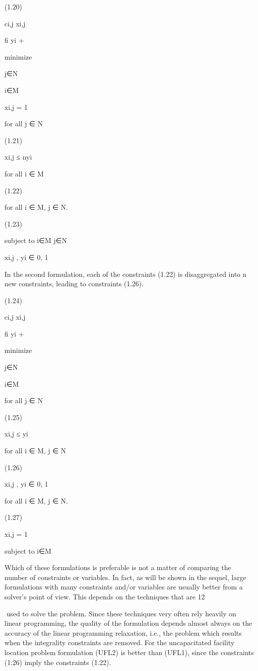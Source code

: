 \documentclass[titlepage]{book}
\begin{document}
(1.20)

ci,j xi,j

fi yi +

minimize

j∈N

i∈M

xi,j = 1

for all j ∈ N

(1.21)

xi,j ≤ nyi

for all i ∈ M

(1.22)

for all i ∈ M, j ∈ N.

(1.23)

subject to
i∈M
j∈N

xi,j , yi ∈ {0, 1}

In the second formulation, each of the constraints (1.22) is disaggregated into n new constraints, leading
to constraints (1.26).

(1.24)

ci,j xi,j

fi yi +

minimize

j∈N

i∈M

for all j ∈ N

(1.25)

xi,j ≤ yi

for all i ∈ M, j ∈ N

(1.26)

xi,j , yi ∈ {0, 1}

for all i ∈ M, j ∈ N.

(1.27)

xi,j = 1

subject to
i∈M

Which of these formulations is preferable is not a matter of comparing the number of constraints or
variables. In fact, as will be shown in the sequel, large formulations with many constraints and/or
variables are usually better from a solver's point of view. This depends on the techniques that are
12

used to solve the problem. Since these techniques very often rely heavily on linear programming, the
quality of the formulation depends almost always on the accuracy of the linear programming relaxation,
i.e., the problem which results when the integrality constraints are removed. For the uncapacitated
facility location problem formulation (UFL2) is better than (UFL1), since the constraints (1.26) imply
the constraints (1.22).
\end{document}
